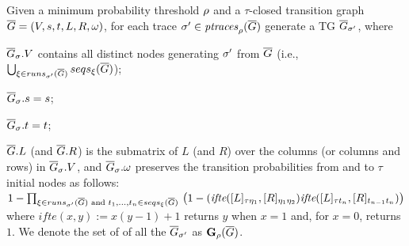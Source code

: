 	\begin{definition}
		Given a minimum probability thre\-shold $\pmin$ and a $\tau$-closed transition graph $\closed{G}=(V,s,t,L,R,\omega)$, for each trace $\nonlogtrace\in\ptraces{\closed{G}}{\pmin}$ generate a TG
$\closed{G}_\nonlogtrace$, where
\begin{inparaenum}[\it (i)]
	\item $\closed{G}_\sigma.V$ contains all distinct nodes generating $\nonlogtrace$ from $\closed{G}$	(i.e., $\bigcup_{\xi\in\runs{\closed{G}}{\nonlogtrace}}\seqs{ \closed{G}}{\xi}$);
	\item $\closed{G}_\sigma.s = s$;
	\item  $\closed{G}_\sigma.t = t$;
	\item $\closed{G}.L$ (and $\closed{G}.R$) is the submatrix of $L$ (and $R$) over the columns (or columns and rows) in $\closed{G}_\sigma.V$, and $\closed{G}_\sigma.\omega$ preserves the transition probabilities from and to $\tau$ initial nodes as follows: $1-\prod_{\xi\in\runs{\closed{G}}{\sigma'}\textup{ and }t_1,\dots,t_n\in\seqs{\closed{G}}{\xi}}\\\left(1-(\textit{ifte}([L]_{\tau\eta_1},[R]_{\eta_1\eta_2})\textit{ifte}([L]_{\tau t_n},[R]_{t_{n-1} t_n})\right)$
	where $\textit{ifte}(x,y):=x(y-1)+1$ returns $y$ when $x=1$ and, for $x=0$, returns $1$. We denote the set of of all the $\closed{G}_\nonlogtrace$ as $\TBf{\pmin}{4}(\closed{G})$.
\end{inparaenum}
%		
	\end{definition}

